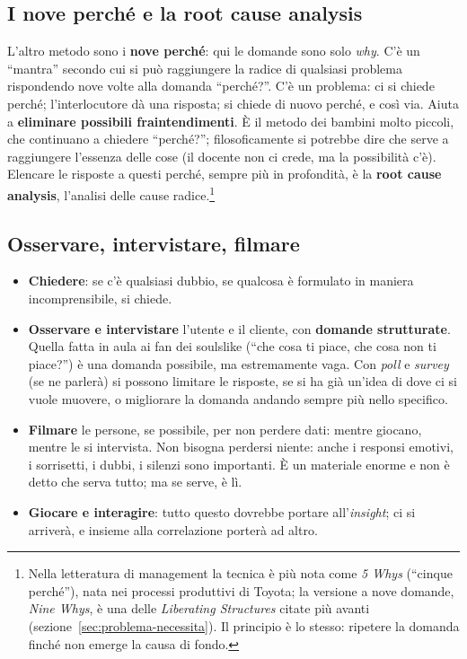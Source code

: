 \subsection{I nove perché e la root cause analysis}

L'altro metodo sono i \textbf{nove perché}: qui le domande sono solo
\emph{why}. C'è un ``mantra'' secondo cui si può raggiungere la radice di
qualsiasi problema rispondendo nove volte alla domanda ``perché?''. C'è un
problema: ci si chiede perché; l'interlocutore dà una risposta; si chiede di
nuovo perché, e così via. Aiuta a \textbf{eliminare possibili
fraintendimenti}. È il metodo dei bambini molto piccoli, che continuano a
chiedere ``perché?''; filosoficamente si potrebbe dire che serve a raggiungere
l'essenza delle cose (il docente non ci crede, ma la possibilità c'è).
Elencare le risposte a questi perché, sempre più in profondità, è la
\textbf{root cause analysis}, l'analisi delle cause
radice.\footnote{Nella letteratura di management la tecnica è più nota come
\emph{5 Whys} (``cinque perché''), nata nei processi produttivi di Toyota; la
versione a nove domande, \emph{Nine Whys}, è una delle \emph{Liberating
Structures} citate più avanti (sezione~\ref{sec:problema-necessita}). Il
principio è lo stesso: ripetere la domanda finché non emerge la causa di
fondo.}

\subsection{Osservare, intervistare, filmare}

\begin{itemize}
  \item \textbf{Chiedere}: se c'è qualsiasi dubbio, se qualcosa è formulato in
        maniera incomprensibile, si chiede.
  \item \textbf{Osservare e intervistare} l'utente e il cliente, con
        \textbf{domande strutturate}. Quella fatta in aula ai fan dei
        soulslike (``che cosa ti piace, che cosa non ti piace?'') è una
        domanda possibile, ma estremamente vaga. Con \emph{poll} e
        \emph{survey} (se ne parlerà) si possono limitare le risposte, se si ha
        già un'idea di dove ci si vuole muovere, o migliorare la domanda
        andando sempre più nello specifico.
  \item \textbf{Filmare} le persone, se possibile, per non perdere dati:
        mentre giocano, mentre le si intervista. Non bisogna perdersi niente:
        anche i responsi emotivi, i sorrisetti, i dubbi, i silenzi sono
        importanti. È un materiale enorme e non è detto che serva tutto; ma
        se serve, è lì.
  \item \textbf{Giocare e interagire}: tutto questo dovrebbe portare
        all'\emph{insight}; ci si arriverà, e insieme alla correlazione porterà
        ad altro.
\end{itemize}

